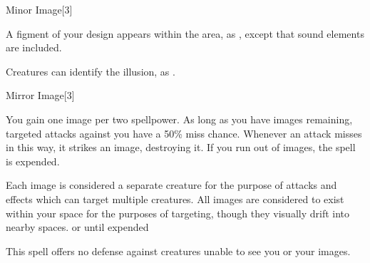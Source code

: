 \begin{spellsection}{Minor Image}[3]
    \begin{spellheader}
    \end{spellheader}
    \begin{spellcontent}
        \begin{spelltargetinginfo}
        \end{spelltargetinginfo}
        \begin{spelleffects}
            \spelleffect A figment of your design appears within the area, as , except that sound elements are included.
            \spelldur \durshort
        \end{spelleffects}
    \end{spellcontent}
    \begin{spellfooter}
        \spellnotes Creatures can identify the illusion, as .
        \miscastexplode
    \end{spellfooter}
\end{spellsection}

\begin{spellsection}{Mirror Image}[3]
    \begin{spellheader}
    \end{spellheader}
    \begin{spellcontent}
        \begin{spelltargetinginfo}
        \end{spelltargetinginfo}
        \begin{spelleffects}
            \spelleffect You gain one image per two spellpower. As long as you have images remaining, targeted attacks against you have a 50\% miss chance. Whenever an attack misses in this way, it strikes an image, destroying it. If you run out of images, the spell is expended.

            Each image is considered a separate creature for the purpose of attacks and effects which can target multiple creatures. All images are considered to exist within your space for the purposes of targeting, though they visually drift into nearby spaces.
            \spelldur \durshort or until expended \dismissable
        \end{spelleffects}
    \end{spellcontent}
    \begin{spellfooter}
        \spellnotes This spell offers no defense against creatures unable to see you or your images.
        \miscastexplode
    \end{spellfooter}
\end{spellsection}

